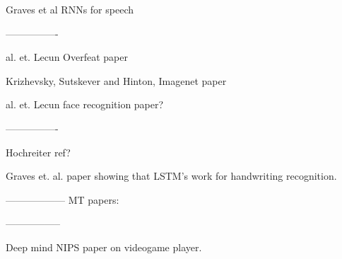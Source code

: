 \documentclass[11pt]{article} %
\begin{document}
Graves et al RNNs for speech
\citep{Graves-et-al-ICASSP2013}

----------------


al. et. Lecun  Overfeat paper
\citep{Sermanet14}

Krizhevsky, Sutskever and Hinton, Imagenet paper
\citep{Krizhevsky-2012-small}

al. et. Lecun face recognition paper?
 
----------------


Hochreiter ref?
\citep{Ciresan-2010}

Graves et. al. paper showing that LSTM's work for handwriting recognition.
\citep{Graves-et-al-2009}

------------------
MT papers:

\citep{Devlin-et-al-ACL2014,Bahdanau-et-al-arxiv2014,Sutskever-et-al-arxiv2014}

-----------------


Deep mind NIPS paper on videogame player.
\citep{Deepmind-atari-arxiv2014}




\end{document}
